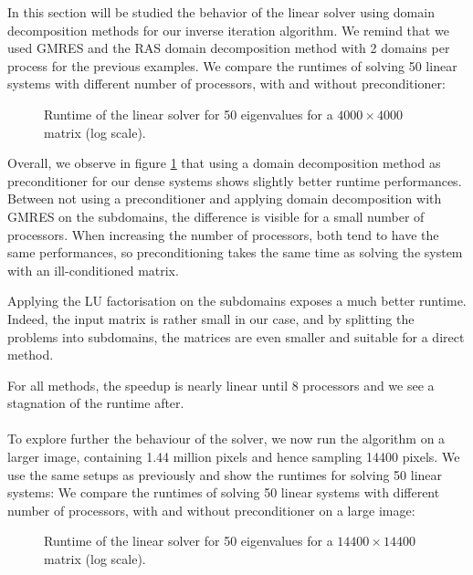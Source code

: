 In this section will be studied the behavior of the linear solver using domain decomposition methods for our inverse iteration algorithm.
We remind that we used GMRES and the RAS domain decomposition method with 2 domains per process for the previous examples.
\ifthesis
 We compare the runtimes of solving 50 linear systems with different number of processors, with and without preconditioner:

 \begin{figure}[H]
  \centering
  
  \caption{Runtime of the linear solver for 50 eigenvalues for a \(4000 \times 4000\) matrix (log scale).}
  \label{fig:linear_solver}
 \end{figure}

 Overall, we observe in figure \ref{fig:linear_solver} that using a domain decomposition method as preconditioner for our dense systems shows slightly better runtime performances.
 Between not using a preconditioner and applying domain decomposition with GMRES on the subdomains, the difference is visible for a small number of processors.
 When increasing the number of processors, both tend to have the same performances, so preconditioning takes the same time as solving the system with an ill-conditioned matrix.

 Applying the LU factorisation on the subdomains exposes a much better runtime.
 Indeed, the input matrix is rather small in our case, and by splitting the problems into subdomains, the matrices are even smaller and suitable for a direct method.

 For all methods, the speedup is nearly linear until 8 processors and we see a stagnation of the runtime after.

 \paragraph{}
 To explore further the behaviour of the solver, we now run the algorithm on a larger image, containing 1.44 million pixels and hence sampling 14400 pixels.
 We use the same setups as previously and show the runtimes for solving 50 linear systems:
\else
 We compare the runtimes of solving 50 linear systems with different number of processors, with and without preconditioner on a large image:
\fi

\begin{figure}[H]
 \centering
 
 \caption{Runtime of the linear solver for 50 eigenvalues for a \(14400 \times 14400\) matrix (log scale).}
 \label{fig:linear_solver_big}
\end{figure}

